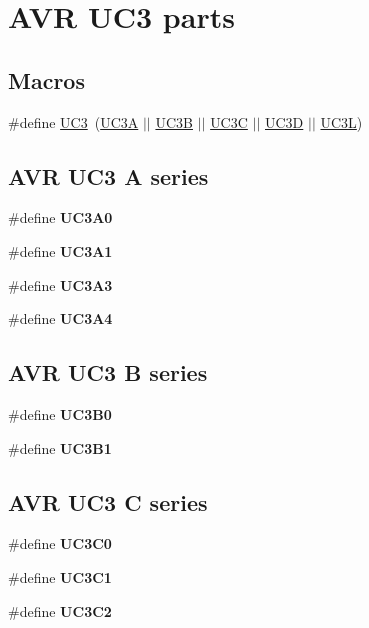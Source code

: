 \hypertarget{group__uc3__part__macros__group}{\section{A\-V\-R U\-C3 parts}
\label{group__uc3__part__macros__group}
}
\subsection*{Macros}
\begin{DoxyCompactItemize}
\item 
\#define \hyperlink{group__uc3__part__macros__group_ga848d950beec67bc702bfcfdecc70bb5b}{U\-C3}~(\hyperlink{group__uc3__part__macros__group_gaf7f16cc2bde7daf34576983fee8824c8}{U\-C3\-A} $|$$|$ \hyperlink{group__uc3__part__macros__group_ga61e51606324c212eb11079e5acf592e0}{U\-C3\-B} $|$$|$ \hyperlink{group__uc3__part__macros__group_gac7a13b9ceb67804d94b6a8967512ee71}{U\-C3\-C} $|$$|$ \hyperlink{group__uc3__part__macros__group_ga351a876f40669641e6ba9620909143d3}{U\-C3\-D} $|$$|$ \hyperlink{group__uc3__part__macros__group_gac8a7d715e500aa74cd05e0f0fc5bb005}{U\-C3\-L})
\end{DoxyCompactItemize}
\subsection*{A\-V\-R U\-C3 A series}
\begin{DoxyCompactItemize}
\item 
\#define {\bfseries U\-C3\-A0}
\item 
\#define {\bfseries U\-C3\-A1}
\item 
\#define {\bfseries U\-C3\-A3}
\item 
\#define {\bfseries U\-C3\-A4}
\end{DoxyCompactItemize}
\subsection*{A\-V\-R U\-C3 B series}
\begin{DoxyCompactItemize}
\item 
\#define {\bfseries U\-C3\-B0}
\item 
\#define {\bfseries U\-C3\-B1}
\end{DoxyCompactItemize}
\subsection*{A\-V\-R U\-C3 C series}
\begin{DoxyCompactItemize}
\item 
\#define {\bfseries U\-C3\-C0}
\item 
\#define {\bfseries U\-C3\-C1}
\item 
\#define {\bfseries U\-C3\-C2}
\end{DoxyCompactItemize}
